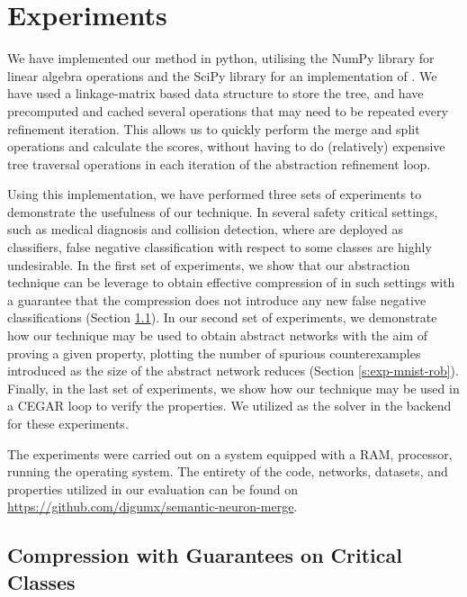 \section{Experiments}

We have implemented our method in python, utilising the NumPy \cite{numpy}
library for linear algebra operations and the SciPy \cite{scipy} library for an
implementation of \hcluster.
We have used a linkage-matrix \cite{scipy-hcluster-linkage}  based
data structure to store the tree, and have precomputed and cached several
operations that may need to be repeated every refinement iteration. This allows
us to quickly perform the merge and split operations and calculate the
scores,  without having to do (relatively)
expensive tree traversal operations in each iteration of the abstraction
refinement loop. 

Using this implementation, we have performed three sets of experiments to
demonstrate the usefulness of our technique. In several safety critical
settings, such as medical diagnosis and collision detection, where \dnn are
deployed as classifiers, false negative classification with respect to some
classes are highly undesirable. In the first set of experiments, we show that
our abstraction technique can be leverage to obtain effective compression of
\dnn in such settings with a guarantee that the compression does not introduce
any new false negative classifications (Section \ref{s:exp-mnist-comp}). In our
second set of experiments, we demonstrate how our technique may be used to
obtain abstract networks with the aim of proving a given property, plotting the
number of spurious counterexamples introduced as the size of the abstract
network reduces (Section \ref{s:exp-mnist-rob}). Finally, in the last set of
experiments, we show how our technique may be used in a CEGAR loop
\cite{cegar-nn} to verify the \acasxu properties. We utilized \abcrown as the 
solver in the backend for these experiments.


The experiments were carried out on a system equipped with a  RAM,
 processor, running the  operating system. 
The entirety of the code, networks, datasets, and properties utilized in our 
evaluation can be found on \href{https://github.com/digumx/semantic-neuron-merge}{https://github.com/digumx/semantic-neuron-merge}.



\subsection{Compression with Guarantees on Critical Classes}
\label{s:exp-mnist-comp}

